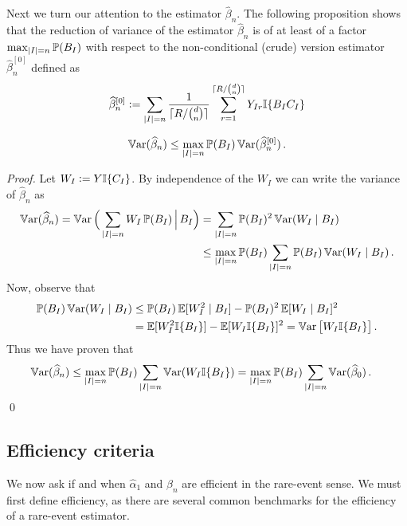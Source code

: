 Next we turn our attention to the estimator $\hat{\beta}_n$.  
The following proposition shows that the reduction of variance of the estimator
$\hat{\beta}_n$ is of at least of a factor $\max_{|I|=n}\operatorname{{\mathbb P}}(B_I)$
with respect to the non-conditional (crude) version estimator $\hat{\beta}_n^{[0]}$
defined as
\begin{equation}
 \hat{\beta}_n^{[0]}:=\sum_{|I|=n} \frac1{\lceil R / \binom{d}{n} \rceil} \sum_{r=1}^{\lceil R / \binom{d}{n} \rceil}  Y_{Ir}\Ind\{B_IC_I\}%
\end{equation}
\begin{Proposition}\label{prop:VarRedCMC}
 \begin{equation*}
  \operatorname{\mathbb{V}\mathrm{ar}}(\widehat{\beta}_n) \le \max_{|I|=n}\operatorname{{\mathbb P}}(B_I) 
   \operatorname{\mathbb{V}\mathrm{ar}}(\widehat{\beta}_n^{[0]}) \,.
 \end{equation*}
\end{Proposition}
\begin{proof}
Let $W_I:=Y\mathbb I\{C_I\}$.  By independence of the $W_I$
we can write the variance of $\hat{\beta}_n$ as
\begin{align*}
\operatorname{\mathbb{V}\mathrm{ar}}(\widehat{\beta}_n)
  =\operatorname{\mathbb{V}\mathrm{ar}}\Big(\sum_{|I|=n} W_I \operatorname{{\mathbb P}}(B_I) \,\Big|\, B_I \Big)
     &=\sum_{|I|=n} \operatorname{{\mathbb P}}(B_I)^2 \operatorname{\mathbb{V}\mathrm{ar}}( W_I \mid B_I )\\
     &\le\max_{|I|=n}\operatorname{{\mathbb P}}(B_I)\sum_{|I|=n} \operatorname{{\mathbb P}}(B_I)\operatorname{\mathbb{V}\mathrm{ar}}( W_I \mid B_I )\,.
\end{align*}
Now, observe that
\begin{align*}
 \operatorname{{\mathbb P}}(B_I)\operatorname{\mathbb{V}\mathrm{ar}}( W_I \mid B_I )
   &\le\operatorname{{\mathbb P}}(B_I)\operatorname{{\mathbb E}}[ W_I^2 \mid B_I] -{\operatorname{{\mathbb P}}(B_I)^2\operatorname{{\mathbb E}}[W_I \mid B_I ]^2}\\
   &=\operatorname{{\mathbb E}}[W_I^2\mathbb I\{B_I\}]-\operatorname{{\mathbb E}}[W_I\mathbb I\{B_I\}]^2
   =\operatorname{\mathbb{V}\mathrm{ar}}\left[W_I\mathbb I\{B_I\}\right].
\end{align*}
Thus we have proven that
\begin{align*}
\operatorname{\mathbb{V}\mathrm{ar}} ( \widehat{\beta}_n )
   &\le\max_{|I|=n}\operatorname{{\mathbb P}}(B_I)\sum_{|I|=n} \operatorname{\mathbb{V}\mathrm{ar}}( W_I\mathbb I\{B_I\} )
   =\max_{|I|=n}\operatorname{{\mathbb P}}(B_I)\sum_{|I|=n}\operatorname{\mathbb{V}\mathrm{ar}}(\widehat{\beta}_0 )\,.
\end{align*}
\qed
\end{proof}


\subsection{Efficiency criteria} \label{scn:criteria}

We now ask if and when $\hat{\alpha}_1$ and $\hat{\beta}_n$ are efficient in the rare-event sense. We must first define efficiency, as there are several common benchmarks for the efficiency of a rare-event estimator.


